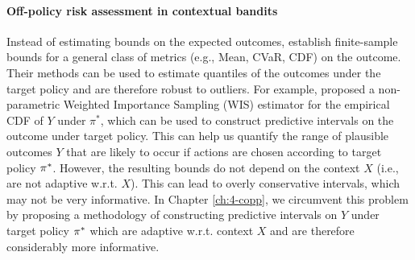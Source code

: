 \paragraph{Off-policy risk assessment in contextual bandits}
Instead of estimating bounds on the expected outcomes, \cite{risk-assessment, chandak2021universal} establish finite-sample bounds for a general class of metrics (e.g., Mean, CVaR, CDF) on the outcome. Their methods can be used to estimate quantiles of the outcomes under the target policy and are therefore robust to outliers. 
For example, \cite{chandak2021universal} proposed a non-parametric Weighted Importance Sampling (WIS) estimator for the empirical CDF of $Y$ under $\pi^*$,
which can be used to construct predictive intervals on the outcome under target policy. This can help us quantify the range of plausible outcomes $Y$ that are likely to occur if actions are chosen according to target policy $\pi^*$. However, the resulting bounds do not depend on the context $X$ (i.e., are not adaptive w.r.t. $X$). This can lead to overly conservative intervals, which may not be very informative. In Chapter \ref{ch:4-copp}, we circumvent this problem by proposing a methodology of constructing predictive intervals on $Y$ under target policy $\pi^*$ which are adaptive w.r.t. context $X$ and are therefore considerably more informative.



